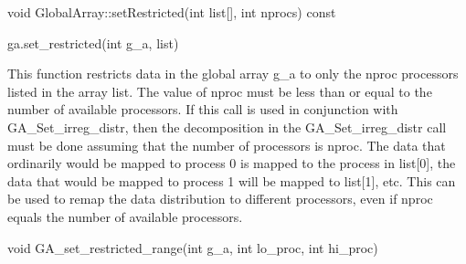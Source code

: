 \documentclass[12pt]{article}
\begin{document}
\begin{cxxapi}
\begin{cxxcode}
void GlobalArray::setRestricted(int list[], int nprocs) const
\end{cxxcode}
\begin{funcargs}
\end{funcargs}
\end{cxxapi}

\begin{pyapi}
\begin{pycode}
ga.set_restricted(int g_a, list)
\end{pycode}
\begin{funcargs}
\end{funcargs}
\end{pyapi}

\gcoll

\begin{desc}

This function restricts data in the global array g_a to only the nproc
processors listed in the array list. The value of nproc must be less than or
equal to the number of available processors. If this call is used in
conjunction with GA_Set_irreg_distr, then the decomposition in the
GA_Set_irreg_distr call must be done assuming that the number of processors is
nproc. The data that ordinarily would be mapped to process 0 is mapped to the
process in list[0], the data that would be mapped to process 1 will be mapped
to list[1], etc. This can be used to remap the data distribution to different
processors, even if nproc equals the number of available processors.

\end{desc}



\begin{capi}
\begin{ccode}
void GA_set_restricted_range(int g_a, int lo_proc, int hi_proc)
\end{ccode}
\begin{funcargs}
\end{funcargs}
\end{capi}
\end{document}
